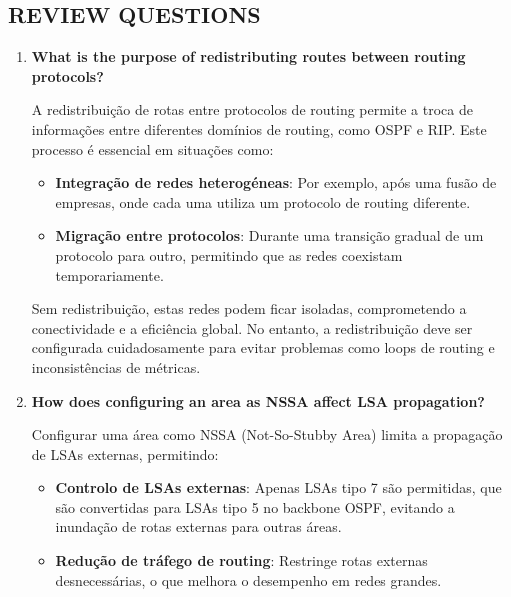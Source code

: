 \documentclass[11pt,english, openright, oneside]{book}
\begin{document}
\newpage
\subsection{REVIEW QUESTIONS}
\vspace{0.2cm}

\begin{enumerate}
  \item \textbf{What is the purpose of redistributing routes between routing protocols?}
  \vspace{0.2cm}

  \par A redistribuição de rotas entre protocolos de routing permite a troca de informações entre diferentes domínios de routing, como OSPF e RIP. Este processo é essencial em situações como:
  \vspace{0.2cm}

  \begin{itemize}
    \item \textbf{Integração de redes heterogéneas}: Por exemplo, após uma fusão de empresas, onde cada uma utiliza um protocolo de routing diferente.
    \item \textbf{Migração entre protocolos}: Durante uma transição gradual de um protocolo para outro, permitindo que as redes coexistam temporariamente.
  \end{itemize}
  \vspace{0.2cm}

  Sem redistribuição, estas redes podem ficar isoladas, comprometendo a conectividade e a eficiência global. No entanto, a redistribuição deve ser configurada cuidadosamente para evitar problemas como loops de routing e inconsistências de métricas.
  \vspace{0.2cm}

  \item \textbf{How does configuring an area as NSSA affect LSA propagation?}
  \vspace{0.2cm}

  \par Configurar uma área como NSSA (Not-So-Stubby Area) limita a propagação de LSAs externas, permitindo:
  \vspace{0.2cm}

  \begin{itemize}
    \item \textbf{Controlo de LSAs externas}: Apenas LSAs tipo 7 são permitidas, que são convertidas para LSAs tipo 5 no backbone OSPF, evitando a inundação de rotas externas para outras áreas.
    \item \textbf{Redução de tráfego de routing}: Restringe rotas externas desnecessárias, o que melhora o desempenho em redes grandes.
  \end{itemize}
  \vspace{0.2cm}


\end{enumerate}
\end{document}
